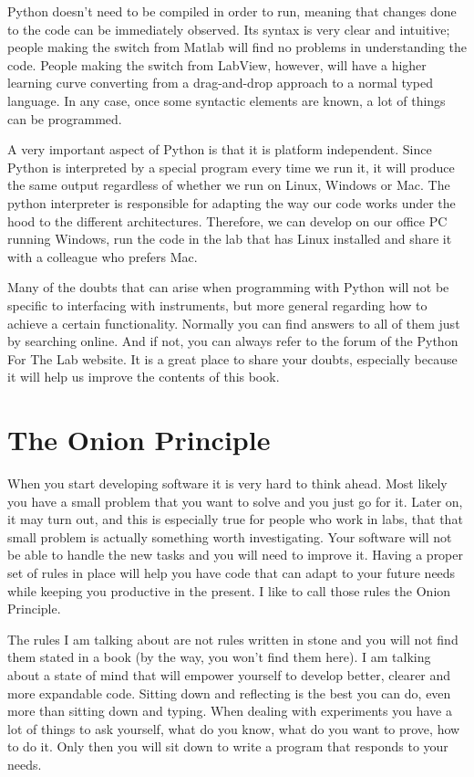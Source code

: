 Python doesn’t need to be compiled in order to run, meaning that changes done to the code can be immediately observed. Its syntax is very clear and intuitive; people making the switch from Matlab will find no problems in understanding the code. People making the switch from LabView, however, will have a higher learning curve converting from a drag-and-drop approach to a normal typed language. In any case, once some syntactic elements are known, a lot of things can be programmed.

A very important aspect of Python is that it is platform independent. Since Python is interpreted by a special program every time we run it, it will produce the same output regardless of whether we run on Linux, Windows or Mac. The python interpreter is responsible for adapting the way our code works under the hood to the different architectures. Therefore, we can develop on our office PC running Windows, run the code in the lab that has Linux installed and share it with a colleague who prefers Mac.

Many of the doubts that can arise when programming with Python will not be specific to interfacing with instruments, but more general regarding how to achieve a certain functionality. Normally you can find answers to all of them just by searching online. And if not, you can always refer to the forum of the Python For The Lab website. It is a great place to share your doubts, especially because it will help us improve the contents of this book.

\section{The Onion Principle}
When you start developing software it is very hard to think ahead. Most likely you have a small problem that you want to solve and you just go for it. Later on, it may turn out, and this is especially true for people who work in labs, that that small problem is actually something worth investigating. Your software will not be able to handle the new tasks and you will need to improve it. Having a proper set of rules in place will help you have code that can adapt to your future needs while keeping you productive in the present. I like to call those rules the Onion Principle.

The rules I am talking about are not rules written in stone and you will not find them stated in a book (by the way, you won’t find them here). I am talking about a state of mind that will empower yourself to develop better, clearer and more expandable code. Sitting down and reflecting is the best you can do, even more than sitting down and typing. When dealing with experiments you have a lot of things to ask yourself, what do you know, what do you want to prove, how to do it. Only then you will sit down to write a program that responds to your needs.


